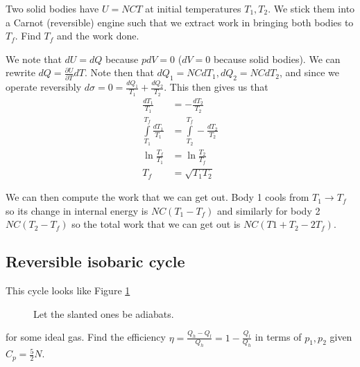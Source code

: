 \documentclass[10pt,twocolumn]{article}
\newcommand{\pd}[2]{\frac{\partial#1}{\partial#2}}
\begin{document}
Two solid bodies have $U = NCT$ at initial temperatures $T_1, T_2$. We stick them into a Carnot (reversible) engine such that we extract work in bringing both bodies to $T_f$. Find $T_f$ and the work done.

We note that $dU = dQ$ because $pdV = 0$ ($dV = 0$ because solid bodies). We can rewrite $dQ = \pd{U}{T}dT$. Note then that $dQ_1 = NCdT_1, dQ_2 = NCdT_2$, and since we operate reversibly $d\sigma = 0 = \frac{dQ_1}{T_1} + \frac{dQ_2}{T_2}$. This then gives us that
\begin{align}
    \frac{dT_1}{T_1} &= -\frac{dT_2}{T_2}\\
    \int\limits_{T_1}^{T_f}\frac{dT_1}{T_1} &= \int\limits_{T_2}^{T_f}-\frac{dT_2}{T_2}\\
    \ln \frac{T_f}{T_1} &= \ln \frac{T_2}{T_f}\\
    T_f &= \sqrt{T_1T_2}
\end{align}

We can then compute the work that we can get out. Body 1 cools from $T_1 \to T_f$ so its change in internal energy is $NC\left( T_1 - T_f \right)$ and similarly for body 2 $NC\left( T_2 - T_f \right)$ so the total work that we can get out is $NC\left( T1 + T_2 - 2T_f \right)$. 

\subsection{Reversible isobaric cycle}

This cycle looks like Figure \ref{RIC}
\begin{figure}[!h]
    \centering
    \caption{Let the slanted ones be adiabats.}
    \label{RIC}
\end{figure}
for some ideal gas. Find the efficiency $\eta = \frac{Q_h - Q_l}{Q_h} = 1 - \frac{Q_l}{Q_h}$ in terms of $p_1, p_2$ given $C_p = \frac{5}{2}N$.
\end{document}
